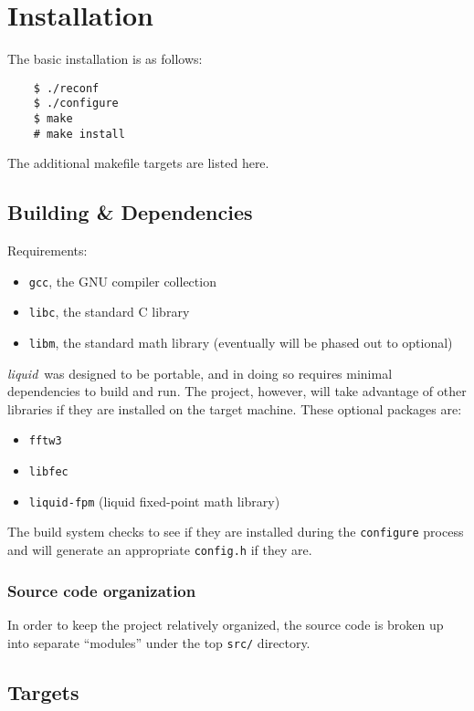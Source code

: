 \documentclass[11pt,twoside]{report}
\newcommand{\liquid}{{\it liquid}}
\begin{document}
\chapter{Installation}
\label{ch:installation}
The basic installation is as follows:
\begin{verbatim}
    $ ./reconf
    $ ./configure
    $ make
    # make install
\end{verbatim}
The additional makefile targets are listed here.

\section{Building \& Dependencies}
\label{ch:installation:building}
Requirements:
\begin{itemize}
\item {\tt gcc}, the GNU compiler collection
\item {\tt libc}, the standard C library
\item {\tt libm}, the standard math library (eventually will be phased out to
optional)
\end{itemize}

\liquid\ was designed to be portable, and in doing so requires minimal dependencies to
build and run.
The project, however, will take advantage of other libraries if they are installed on the
target machine.
These optional packages are:
\begin{itemize}
\item {\tt fftw3}
\item {\tt libfec}
\item {\tt liquid-fpm} (liquid fixed-point math library)
\end{itemize}
The build system checks to see if they are installed during the {\tt configure} process
and will generate an appropriate {\tt config.h} if they are.

\subsection{Source code organization}
In order to keep the project relatively organized, the source code is broken
up into separate ``modules'' under the top {\tt src/} directory.

\section{Targets}
\label{ch:installation:targets}
\end{document}

